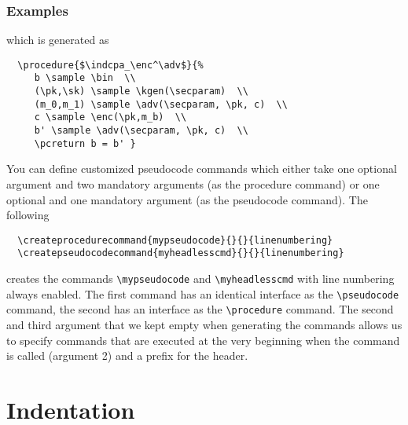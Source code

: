 \documentclass[a4paper]{report}
\begin{document}
  \subsubsection{Examples}
  \begin{center}
  \end{center}
  which is generated as
  \begin{lstlisting}
  \procedure{$\indcpa_\enc^\adv$}{%
	 b \sample \bin  \\
	 (\pk,\sk) \sample \kgen(\secparam)  \\
	 (m_0,m_1) \sample \adv(\secparam, \pk, c)  \\
	 c \sample \enc(\pk,m_b)  \\
	 b' \sample \adv(\secparam, \pk, c)  \\
	 \pcreturn b = b' }
  \end{lstlisting}
  
  You can define customized pseudocode commands which either take one optional argument and two mandatory arguments (as the procedure command)
  or one optional and one mandatory argument (as the pseudocode command). The following
  \begin{lstlisting}
  \createprocedurecommand{mypseudocode}{}{}{linenumbering}
  \createpseudocodecommand{myheadlesscmd}{}{}{linenumbering}
  \end{lstlisting}
  creates the commands \lstinline$\mypseudocode$ and \lstinline$\myheadlesscmd$ with line numbering always enabled. The first command
  has an identical interface as the \lstinline$\pseudocode$ command, the second has an interface as the \lstinline$\procedure$ command.
  The second and third argument that we kept empty when generating the commands allows us to specify commands that are executed at the
  very beginning when the command is called (argument 2) and a prefix for the header.
  
  
  \section{Indentation}
  
\end{document}
